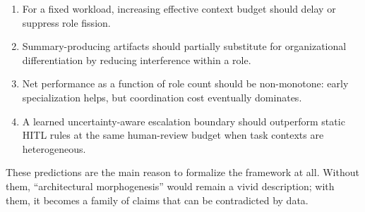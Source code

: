 \begin{enumerate}[leftmargin=*]
\item For a fixed workload, increasing effective context budget should delay or suppress role fission.
\item Summary-producing artifacts should partially substitute for organizational differentiation by reducing interference within a role.
\item Net performance as a function of role count should be non-monotone: early specialization helps, but coordination cost eventually dominates.
\item A learned uncertainty-aware escalation boundary should outperform static HITL rules at the same human-review budget when task contexts are heterogeneous.
\end{enumerate}

These predictions are the main reason to formalize the framework at all. Without them, ``architectural morphogenesis'' would remain a vivid description; with them, it becomes a family of claims that can be contradicted by data.
